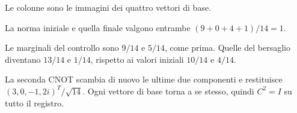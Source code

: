 
Le colonne sono le immagini dei quattro vettori di base.


La norma iniziale e quella finale valgono entrambe \((9+0+4+1)/14=1\).


Le marginali del controllo sono \(9/14\) e \(5/14\), come prima. Quelle del bersaglio diventano \(13/14\) e \(1/14\), rispetto ai valori iniziali \(10/14\) e \(4/14\).


La seconda CNOT scambia di nuovo le ultime due componenti e restituisce \((3,0,-1,2i)^T/\sqrt{14}\). Ogni vettore di base torna a se stesso, quindi \(C^2=I\) su tutto il registro.

